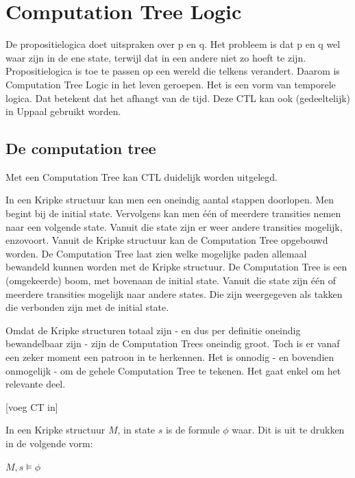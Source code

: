 \documentclass{article}
\begin{document}
	\newpage
	
	
	\section{Computation Tree Logic}
	
	De propositielogica doet uitspraken over p en q. Het probleem is dat p en q wel waar zijn in de ene state, terwijl dat in een andere niet zo hoeft te zijn. Propositielogica is toe te passen op een wereld die telkens verandert. Daarom is Computation Tree Logic in het leven geroepen. Het is een vorm van temporele logica. Dat betekent dat het afhangt van de tijd. Deze CTL kan ook (gedeeltelijk) in Uppaal gebruikt worden.
		
		\subsection{De computation tree}
		
		Met een Computation Tree kan CTL duidelijk worden uitgelegd. 

		In een Kripke structuur kan men een oneindig aantal stappen doorlopen. Men begint bij de initial state. Vervolgens kan men één of meerdere transities nemen naar een volgende state. Vanuit die state zijn er weer andere transities mogelijk, enzovoort. Vanuit de Kripke structuur kan de Computation Tree opgebouwd worden. De Computation Tree laat zien welke mogelijke paden allemaal bewandeld kunnen worden met de Kripke structuur. De Computation Tree is een (omgekeerde) boom, met bovenaan de initial state. Vanuit die state zijn één of meerdere transities mogelijk naar andere states. Die zijn weergegeven als takken die verbonden zijn met de initial state.
		
		Omdat de Kripke structuren totaal zijn - en dus per definitie oneindig bewandelbaar zijn - zijn de Computation Trees oneindig groot. Toch is er vanaf een zeker moment een patroon in te herkennen. Het is onnodig - en bovendien onmogelijk - om de gehele Computation Tree te tekenen. Het gaat enkel om het relevante deel.

		[voeg CT in]

		In een Kripke structuur \( M \), in state \( s \) is de formule \( \phi \) waar. Dit is uit te drukken in de volgende vorm:

		\( M, s \models \phi \)
\end{document}
